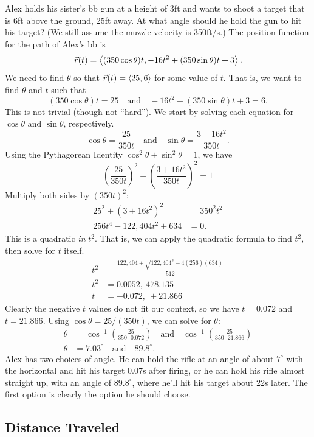 \begin{example}\label{ex_motion61}%
Alex holds his sister's bb gun at a height of 3ft and wants to shoot a target that is 6ft above the ground, 25ft away. At what angle should he hold the gun to hit his target? (We still assume the muzzle velocity is 350ft/s.)
\solution
The position function for the path of Alex's bb is
\[\vec r(t) =\left\langle (350\cos \theta)t, -16t^2+(350\sin\theta)t+3\right\rangle.\]
We need to find $\theta$ so that $\vec r(t) =\left\langle 25,6\right\rangle$ for some value of $t$. That is, we want to find $\theta$ and $t$ such that 
\[(350\cos\theta)t = 25 \quad \text{and}\quad -16t^2+(350\sin\theta)t+3 = 6.\]
This is not trivial (though not ``hard''). We start by solving each equation for $\cos\theta$ and $\sin \theta$, respectively.
\[\cos\theta = \frac{25}{350t} \quad \text{and} \quad \sin\theta = \frac{3+16t^2}{350t}.\]
Using the Pythagorean Identity $\cos^2\theta+\sin^2\theta=1$, we have
\[\left(\frac{25}{350t}\right)^2 + \left(\frac{3+16t^2}{350t}\right)^2 =1\]
Multiply both sides by $(350t)^2$:
\begin{align*}
25^2 + (3+16t^2)^2 &=350^2t^2\\
256t^4-122,404t^2+634 &=0.
\end{align*}
This is a quadratic \emph{in} $t^2$. That is, we can apply the quadratic formula  to find $t^2$, then solve for $t$ itself.
\begin{align*}
t^2 &= \frac{122,404\pm\sqrt{122,404^2-4(256)(634)}}{512}\\
t^2 &= 0.0052,\ 478.135\\
t &=  \pm 0.072,\ \pm 21.866
\end{align*}
Clearly the negative $t$ values do not fit our context, so we have $t=0.072$ and $t=21.866$. Using $\cos \theta = 25/(350 t)$, we can solve for $\theta$:
\begin{align*}
\theta &= \cos^{-1}\left(\frac{25}{350\cdot 0.072}\right)\quad \text{and}\quad \cos^{-1}\left(\frac{25}{350\cdot 21.866}\right)\\
\theta &= 7.03^\circ \quad \text{and} \quad 89.8^\circ.
\end{align*}
Alex has two choices of angle. He can hold the rifle at an angle of about $7^\circ$ with the horizontal and hit his target $0.07$s after firing, or he can hold his rifle almost straight up, with an angle of $89.8^\circ$, where he'll hit his target about 22s later. The first option is clearly the option he should choose.
\end{example}

\subsection{Distance Traveled}

